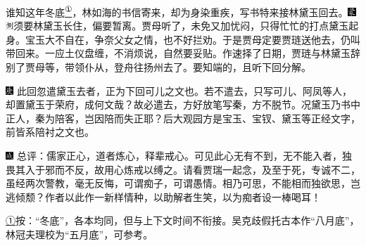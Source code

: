 谁知这年冬底\href{../Text/part0016_split_000.html\#lnkback_1_a}{\textsuperscript{①}}，林如海的书信寄来，却为身染重疾，写书特来接林黛玉回去。{\includegraphics[width=3mm]{../Images/00006}\includegraphics[width=3mm]{../Images/00011}\footnotesize \kaishu 须要林黛玉长住，偏要暂离。}贾母听了，未免又加忧闷，只得忙忙的打点黛玉起身。宝玉大不自在，争奈父女之情，也不好拦劝。于是贾母定要贾琏送他去，仍叫带回来。一应土仪盘缠，不消烦说，自然要妥贴。作速择了日期，贾琏与林黛玉辞别了贾母等，带领仆从，登舟往扬州去了。要知端的，且听下回分解。

{{\includegraphics[width=3mm]{../Images/00004}  \kaishu 此回忽遣黛玉去者，正为下回可儿之文也。若不遣去，只写可儿、阿凤等人，却置黛玉于荣府，成何文哉？故必遣去，方好放笔写秦，方不脱节。况黛玉乃书中正人，秦为陪客，岂因陪而失正耶？后大观园方是宝玉、宝钗、黛玉等正经文字，前皆系陪衬之文也。}}

{\includegraphics[width=3mm]{../Images/00005}  \kaishu  总评：儒家正心，道者炼心，释辈戒心。可见此心无有不到，无不能入者，独畏其入于邪而不反，故用心炼戒以缚之。请看贾瑞一起念，及至于死，专诚不二，虽经两次警教，毫无反悔，可谓痴子，可谓愚情。相乃可思，不能相而独欲思，岂逃倾颓？作者以此作一新样情种，以助解者生笑，以为痴者设一棒喝耳！}

{\href{../Text/part0016_split_000.html\#navto_1_a}{①}按：``冬底''，各本均同，但与上下文时间不衔接。吴克歧假托古本作``八月底''，林冠夫理校为``五月底''，可参考。}
